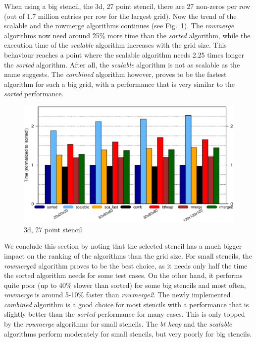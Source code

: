 When using a big stencil, the 3d, 27 point stencil, there are 27 non-zeros per row (out of 1.7 million entries per row for the largest grid). Now the trend of the scalable and the rowmerge algorithms continues (see Fig.~\ref{fig:seq3d27point}). The \textit{rowmerge} algorithms now need around 25\% more time than the \textit{sorted} algorithm, while the execution time of the \textit{scalable} algorithm increases with the grid size. This behaviour reaches a point where the scalable algorithm needs 2.25 times longer the \textit{sorted} algorithm. After all, the \textit{scalable} algorithm is not as scalable as the name suggests. The \textit{combined} algorithm however, proves to be the fastest algorithm for such a big grid, with a performance that is very similar to the \textit{sorted} performance. 

\begin{figure}[tbp]
	\centering
	\includegraphics[width=1.05\textwidth, trim={0 7.3cm 0 1cm},clip]{seq_3d27point}
	\caption{3d, 27 point stencil} 
	\label{fig:seq3d27point}
\end{figure}

We conclude this section by noting that the selected stencil has a much bigger impact on the ranking of the algorithms than the grid size. For small stencils, the \textit{rowmerge2} algorithm proves to be the best choice, as it needs only half the time the sorted algorithm needs for some test cases. On the other hand, it performs quite poor (up to 40\% slower than sorted) for some big stencils and most often, \textit{rowmerge} is around 5-10\% faster than \textit{rowmerge2}. The newly implemented \textit{combined} algorithm is a good choice for most stencils with a performance that is slightly better than the \textit{sorted} performance for many cases. This is only topped by the \textit{rowmerge} algorithms for small stencils. The \textit{bt heap} and the \textit{scalable} algorithms perform moderately for small stencils, but very poorly for big stencils. 

